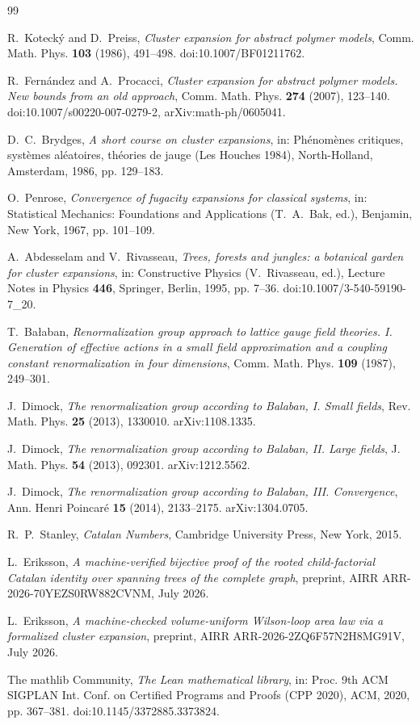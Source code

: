 \documentclass[11pt]{article}
\begin{document}
\begin{thebibliography}{99}

 R.~Kotecký and D.~Preiss,
\emph{Cluster expansion for abstract polymer models},
Comm. Math. Phys. \textbf{103} (1986), 491--498.
doi:10.1007/BF01211762.

 R.~Fernández and A.~Procacci,
\emph{Cluster expansion for abstract polymer models. New bounds from
an old approach}, Comm. Math. Phys. \textbf{274} (2007), 123--140.
doi:10.1007/s00220-007-0279-2, arXiv:math-ph/0605041.

 D.~C.~Brydges,
\emph{A short course on cluster expansions}, in: Phénomènes critiques,
systèmes aléatoires, théories de jauge (Les Houches 1984),
North-Holland, Amsterdam, 1986, pp. 129--183.

 O.~Penrose,
\emph{Convergence of fugacity expansions for classical systems}, in:
Statistical Mechanics: Foundations and Applications (T.~A.~Bak, ed.),
Benjamin, New York, 1967, pp. 101--109.

 A.~Abdesselam and V.~Rivasseau,
\emph{Trees, forests and jungles: a botanical garden for cluster
expansions}, in: Constructive Physics (V.~Rivasseau, ed.), Lecture
Notes in Physics \textbf{446}, Springer, Berlin, 1995, pp. 7--36.
doi:10.1007/3-540-59190-7\_20.

 T.~Bałaban,
\emph{Renormalization group approach to lattice gauge field theories.
I. Generation of effective actions in a small field approximation and
a coupling constant renormalization in four dimensions},
Comm. Math. Phys. \textbf{109} (1987), 249--301.

 J.~Dimock,
\emph{The renormalization group according to Balaban, I. Small
fields}, Rev. Math. Phys. \textbf{25} (2013), 1330010.
arXiv:1108.1335.

 J.~Dimock,
\emph{The renormalization group according to Balaban, II. Large
fields}, J. Math. Phys. \textbf{54} (2013), 092301.
arXiv:1212.5562.

 J.~Dimock,
\emph{The renormalization group according to Balaban, III.
Convergence}, Ann. Henri Poincaré \textbf{15} (2014), 2133--2175.
arXiv:1304.0705.

 R.~P.~Stanley,
\emph{Catalan Numbers}, Cambridge University Press, New York, 2015.

 L.~Eriksson,
\emph{A machine-verified bijective proof of the rooted
child-factorial Catalan identity over spanning trees of the complete
graph}, preprint, AIRR ARR-2026-70YEZS0RW882CVNM, July 2026.

 L.~Eriksson,
\emph{A machine-checked volume-uniform Wilson-loop area law via a
formalized cluster expansion}, preprint, AIRR ARR-2026-2ZQ6F57N2H8MG91V,
July 2026.

 The mathlib Community,
\emph{The Lean mathematical library}, in: Proc. 9th ACM SIGPLAN
Int. Conf. on Certified Programs and Proofs (CPP 2020), ACM, 2020,
pp. 367--381. doi:10.1145/3372885.3373824.

\end{thebibliography}
\end{document}
